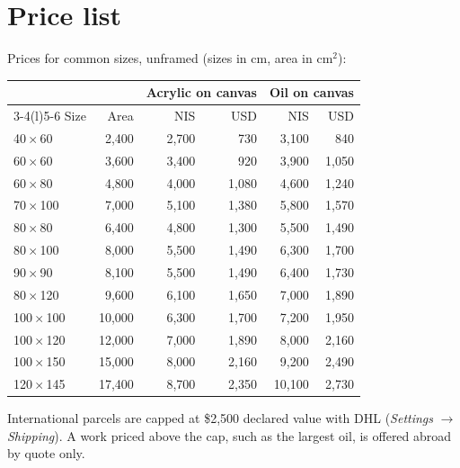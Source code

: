 \documentclass[11pt,a4paper]{article}
\begin{document}
\section{Price list}
Prices for common sizes, unframed (sizes in cm, area in cm$^2$):
\begin{center}
\begin{tabular}{@{}lrrrrr@{}}
  \toprule
  & & \multicolumn{2}{c}{Acrylic on canvas} & \multicolumn{2}{c}{Oil on canvas} \\
  \cmidrule(lr){3-4}\cmidrule(l){5-6}
  Size & Area & NIS & USD & NIS & USD \\
  \midrule
  40\,$\times$\,60 & 2{,}400 & 2{,}700 & 730 & 3{,}100 & 840 \\
  60\,$\times$\,60 & 3{,}600 & 3{,}400 & 920 & 3{,}900 & 1{,}050 \\
  60\,$\times$\,80 & 4{,}800 & 4{,}000 & 1{,}080 & 4{,}600 & 1{,}240 \\
  70\,$\times$\,100 & 7{,}000 & 5{,}100 & 1{,}380 & 5{,}800 & 1{,}570 \\
  80\,$\times$\,80 & 6{,}400 & 4{,}800 & 1{,}300 & 5{,}500 & 1{,}490 \\
  80\,$\times$\,100 & 8{,}000 & 5{,}500 & 1{,}490 & 6{,}300 & 1{,}700 \\
  90\,$\times$\,90 & 8{,}100 & 5{,}500 & 1{,}490 & 6{,}400 & 1{,}730 \\
  80\,$\times$\,120 & 9{,}600 & 6{,}100 & 1{,}650 & 7{,}000 & 1{,}890 \\
  100\,$\times$\,100 & 10{,}000 & 6{,}300 & 1{,}700 & 7{,}200 & 1{,}950 \\
  100\,$\times$\,120 & 12{,}000 & 7{,}000 & 1{,}890 & 8{,}000 & 2{,}160 \\
  100\,$\times$\,150 & 15{,}000 & 8{,}000 & 2{,}160 & 9{,}200 & 2{,}490 \\
  120\,$\times$\,145 & 17{,}400 & 8{,}700 & 2{,}350 & 10{,}100 & 2{,}730 \\
  \bottomrule
\end{tabular}
\end{center}
International parcels are capped at \$2{,}500 declared value with DHL (\emph{Settings}
$\rightarrow$ \emph{Shipping}). A work priced above the cap, such as the largest oil, is offered
abroad by quote only.
\end{document}
